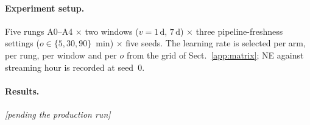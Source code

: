 \paragraph{Experiment setup.} Five rungs A0--A4 $\times$ two windows ($v=1$\,d, $7$\,d) $\times$ three pipeline-freshness settings ($o \in \{5, 30, 90\}$~min) $\times$ five seeds. The learning rate is selected per arm, per rung, per window and per $o$ from the grid of Sect.~\ref{app:matrix}; NE against streaming hour is recorded at seed~0.

\paragraph{Results.} \emph{[pending the production run]}

